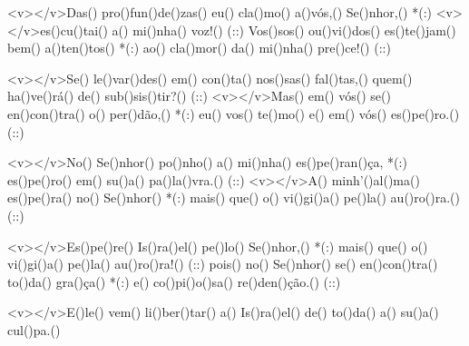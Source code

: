 <v></v>Das() pro()fun()de()zas() eu() cla()mo() a()vós,() Se()nhor,() *(:)
<v></v>es()cu()tai() a() mi()nha() voz!() (::)
Vos()sos() ou()vi()dos() es()te()jam() bem() a()ten()tos() *(:)
ao() cla()mor() da() mi()nha() pre()ce!() (::)

<v></v>Se() le()var()des() em() con()ta() nos()sas() fal()tas,()
quem() ha()ve()rá() de() sub()sis()tir?() (::)
<v></v>Mas() em() vós() se() en()con()tra() o() per()dão,() *(:)
eu() vos() te()mo() e() em() vós() es()pe()ro.() (::)

<v></v>No() Se()nhor() po()nho() a() mi()nha() es()pe()ran()ça, *(:)
es()pe()ro() em() su()a() pa()la()vra.() (::)
<v></v>A() minh'()al()ma() es()pe()ra() no() Se()nhor() *(:)
mais() que() o() vi()gi()a() pe()la() au()ro()ra.() (::)

<v></v>Es()pe()re() Is()ra()el() pe()lo() Se()nhor,() *(:)
mais() que() o() vi()gi()a() pe()la() au()ro()ra!() (::)
pois() no() Se()nhor() se() en()con()tra() to()da() gra()ça() *(:)
e() co()pi()o()sa() re()den()ção.() (::)

<v></v>E()le() vem() li()ber()tar() a() Is()ra()el()
de() to()da() a() su()a() cul()pa.()